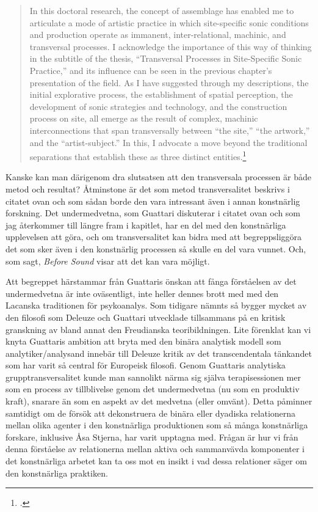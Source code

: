 \documentclass[11pt]{article}
\begin{document}
\begin{quote}
    In this doctoral research, the concept of assemblage has enabled
    me to articulate a mode of artistic practice in which
    site-specific sonic conditions and production operate as immanent,
    inter-relational, machinic, and transversal processes. I
    acknowledge the importance of this way of thinking in the subtitle
    of the thesis, “Transversal Processes in Site-Specific Sonic
    Practice,” and its influence can be seen in the previous chapter’s
    presentation of the field. As I have suggested through my
    descriptions, the initial explorative process, the establishment
    of spatial perception, the development of sonic strategies and
    technology, and the construction process on site, all emerge as
    the result of complex, machinic interconnections that span
    transversally between “the site,” “the artwork,” and the
    “artist-subject.” In this, I advocate a move beyond the
    traditional separations that establish these as three distinct
    entities.\footcite[s.92]{Stjerna2018}
\end{quote}

Kanske kan man därigenom dra slutsatsen att den transversala processen
är både metod och resultat? Åtminstone är det som metod
transversalitet beskrivs i citatet ovan och som sådan borde den vara
intressant även i annan konstnärlig forskning. Det undermedvetna, som Guattari
diskuterar i citatet ovan och som jag återkommer till längre fram i kapitlet, har en del med den konstnärliga upplevelsen
att göra, och om transversalitet kan bidra med att begreppsliggöra det
som sker även i den konstnärlig processen så skulle en del vara
vunnet. Och, som sagt, \emph{Before Sound} visar att det kan vara
möjligt.

Att begreppet härstammar från Guattaris önskan att fånga förståelsen
av det undermedvetna är inte oväsentligt, inte heller dennes brott med
med den Lacanska traditionen för psykoanalys. Som tidigare nämnts så
bygger mycket av den filosofi som Deleuze och Guattari utvecklade
tillsammans på en kritisk granskning av bland annat den Freudianska
teoribildningen. Lite förenklat kan vi knyta Guattaris ambition att
bryta med den binära analytisk modell som analytiker/analysand
innebär till Deleuze kritik av det transcendentala tänkandet som har
varit så central för Europeisk filosofi. Genom Guattaris analytiska
grupptransversalitet kunde man sannolikt närma sig själva
terapisessionen mer som en process av tillblivelse genom det
undermedvetna (nu som en produktiv kraft), snarare än som en aspekt av
det medvetna (eller omvänt). Detta påminner samtidigt om de försök att
dekonstruera de binära eller dyadiska relationerna mellan olika
agenter i den konstnärliga produktionen som så många konstnärliga
forskare, inklusive Åsa Stjerna, har varit upptagna med. Frågan är hur
vi från denna förståelse av relationerna mellan aktiva och sammanvävda
komponenter i det konstnärliga arbetet kan ta oss mot en insikt i vad
dessa relationer säger om den konstnärliga praktiken.
\end{document}
